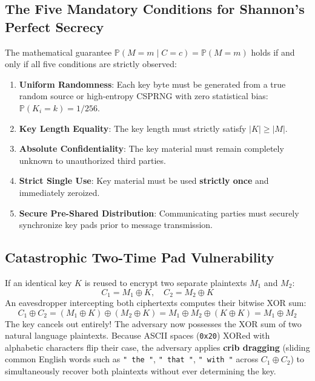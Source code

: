 \documentclass[12pt,a4paper]{report}
\begin{document}
\subsection{The Five Mandatory Conditions for Shannon's Perfect Secrecy}
The mathematical guarantee $\mathbb{P}(M = m \mid C = c) = \mathbb{P}(M = m)$ holds if and only if all five conditions are strictly observed:
\begin{enumerate}
    \item \textbf{Uniform Randomness}: Each key byte must be generated from a true random source or high-entropy CSPRNG with zero statistical bias: $\mathbb{P}(K_i = k) = 1/256$.
    \item \textbf{Key Length Equality}: The key length must strictly satisfy $|K| \ge |M|$.
    \item \textbf{Absolute Confidentiality}: The key material must remain completely unknown to unauthorized third parties.
    \item \textbf{Strict Single Use}: Key material must be used \textbf{strictly once} and immediately zeroized.
    \item \textbf{Secure Pre-Shared Distribution}: Communicating parties must securely synchronize key pads prior to message transmission.
\end{enumerate}

\subsection{Catastrophic Two-Time Pad Vulnerability}
If an identical key $K$ is reused to encrypt two separate plaintexts $M_1$ and $M_2$:
\begin{equation}
    C_1 = M_1 \oplus K, \quad C_2 = M_2 \oplus K
\end{equation}
An eavesdropper intercepting both ciphertexts computes their bitwise XOR sum:
\begin{equation}
    C_1 \oplus C_2 = (M_1 \oplus K) \oplus (M_2 \oplus K) = M_1 \oplus M_2 \oplus (K \oplus K) = M_1 \oplus M_2
\end{equation}
The key cancels out entirely! The adversary now possesses the XOR sum of two natural language plaintexts. Because ASCII spaces (\texttt{0x20}) XORed with alphabetic characters flip their case, the adversary applies \textbf{crib dragging} (sliding common English words such as \texttt{" the "}, \texttt{" that "}, \texttt{" with "} across $C_1 \oplus C_2$) to simultaneously recover both plaintexts without ever determining the key.
\end{document}

